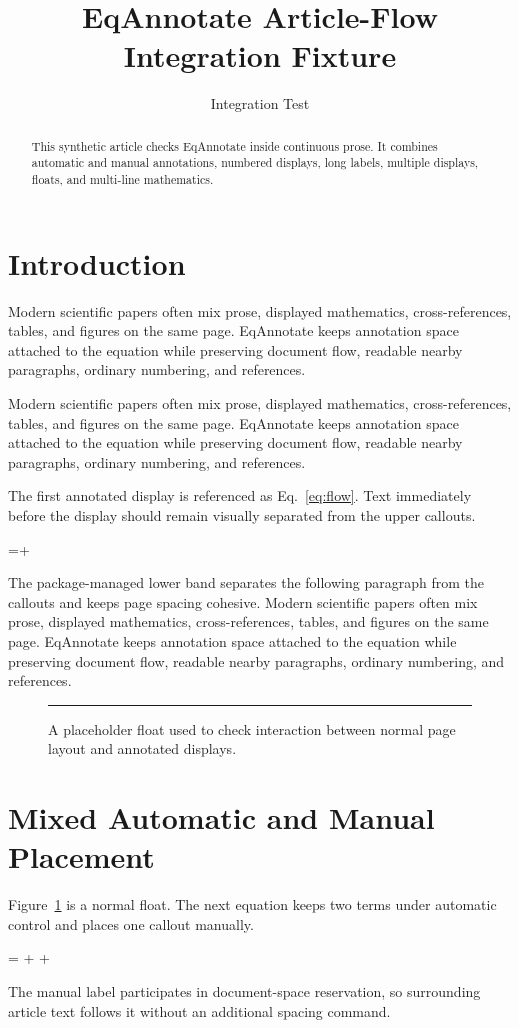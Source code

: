 \documentclass[11pt]{article}
\title{EqAnnotate Article-Flow Integration Fixture}
\author{Integration Test}
\date{}
\newcommand{\demotext}{Modern scientific papers often mix prose, displayed mathematics, cross-references, tables, and figures on the same page. EqAnnotate keeps annotation space attached to the equation while preserving document flow, readable nearby paragraphs, ordinary numbering, and references.}
\begin{document}
\maketitle
\begin{abstract}
This synthetic article checks EqAnnotate inside continuous prose. It combines automatic and manual annotations, numbered displays, long labels, multiple displays, floats, and multi-line mathematics.
\end{abstract}

\section{Introduction}
\demotext

\demotext

The first annotated display is referenced as Eq.~\eqref{eq:flow}. Text immediately before the display should remain visually separated from the upper callouts.
\begin{annotatedequation}[numbered]
=+
\label{eq:flow}
\end{annotatedequation}
The package-managed lower band separates the following paragraph from the callouts and keeps page spacing cohesive. \demotext

\begin{figure}[t]
\centering
\rule{0.82\linewidth}{24mm}
\caption{A placeholder float used to check interaction between normal page layout and annotated displays.}
\label{fig:placeholder}
\end{figure}

\section{Mixed Automatic and Manual Placement}
Figure~\ref{fig:placeholder} is a normal float. The next equation keeps two terms under automatic control and places one callout manually.
\begin{annotatedequation}[numbered]
=
+
+
\label{eq:loss}
\end{annotatedequation}
The manual label participates in document-space reservation, so surrounding article text follows it without an additional spacing command.
\end{document}
